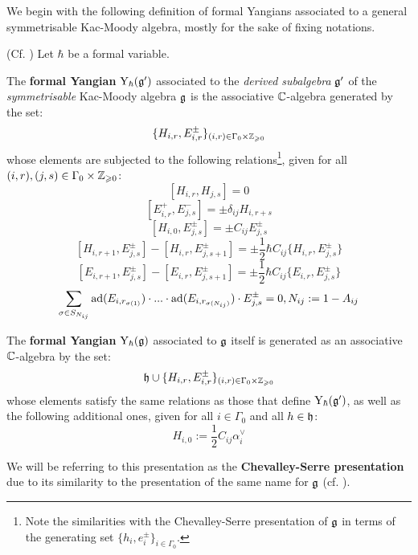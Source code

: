             We begin with the following definition of formal Yangians associated to a general symmetrisable Kac-Moody algebra, mostly for the sake of fixing notations.
            \begin{definition} \label{def: kac_moody_formal_yangians}
                (Cf. \cite[Definition 2.1]{guay_nakajima_wendlandt_affine_yangian_coproduct}) Let $\hbar$ be a formal variable. 
                
                The \textbf{formal Yangian} $\mathrm{Y}_{\hbar}(\mathfrak{g}')$ associated to the \textit{derived subalgebra} $\mathfrak{g}'$ of the \textit{symmetrisable} Kac-Moody algebra $\mathfrak{g}$ is the associative $\mathbb{C}$-algebra generated by the set:
                    $$\{ H_{i, r}, E_{i, r}^{\pm} \}_{(i, r) \in \Gamma_0 \x \Z_{\geq 0}}$$
                whose elements are subjected to the following relations\footnote{Note the similarities with the Chevalley-Serre presentation of $\mathfrak{g}$ in terms of the generating set $\{ h_i, e_i^{\pm} \}_{i \in \Gamma_0}$.}, given for all $(i, r), (j, s) \in \Gamma_0 \x \Z_{\geq 0}$:
                    $$[ H_{i, r}, H_{j, s} ] = 0$$
                    $$[ E_{i, r}^+, E_{j, s}^- ] = \pm \delta_{ij} H_{i, r + s}$$
                    $$[ H_{i, 0}, E_{j, s}^{\pm} ] = \pm C_{ij} E_{j, s}^{\pm}$$
                    $$[ H_{i, r + 1}, E_{j, s}^{\pm} ] - [ H_{i, r}, E_{j, s + 1}^{\pm} ] = \pm \frac12 \hbar C_{ij} \{H_{i, r}, E_{j, s}^{\pm}\}$$
                    $$[ E_{i, r + 1}, E_{j, s}^{\pm} ] - [ E_{i, r}, E_{j, s + 1}^{\pm} ] = \pm \frac12 \hbar C_{ij} \{E_{i, r}, E_{j, s}^{\pm}\}$$
                    $$\sum_{\sigma \in S_{N_{ij}}} \mathrm{ad}(E_{i, r_{\sigma(1)}}) \cdot ... \cdot \mathrm{ad}(E_{i, r_{\sigma(N_{ij})}}) \cdot E_{j, s}^{\pm} = 0, N_{ij} := 1 - A_{ij}$$

                The \textbf{formal Yangian} $\mathrm{Y}_{\hbar}(\mathfrak{g})$ associated to $\mathfrak{g}$ itself is generated as an associative $\mathbb{C}$-algebra by the set:
                    $$\h \cup \{ H_{i, r}, E_{i, r}^{\pm} \}_{(i, r) \in \Gamma_0 \x \Z_{\geq 0}}$$
                whose elements satisfy the same relations as those that define $\mathrm{Y}_{\hbar}(\mathfrak{g}')$, as well as the following additional ones, given for all $i \in \Gamma_0$ and all $h \in \mathfrak{h}$:
                    $$H_{i, 0} := \frac12 C_{ij} \alpha_i^{\vee}$$
                    $$$$
                    
                We will be referring to this presentation as the \textbf{Chevalley-Serre presentation} due to its similarity to the presentation of the same name for $\mathfrak{g}$ (cf. \cite[Section 8]{humphreys_lie_algebras}). 
            \end{definition}
